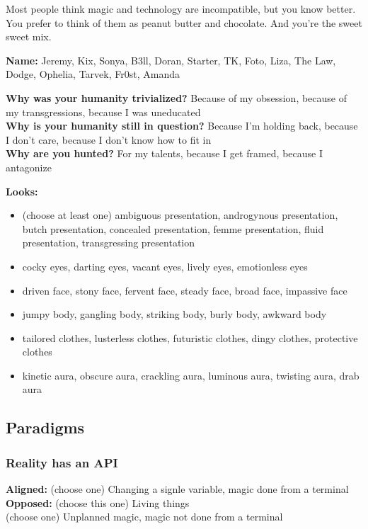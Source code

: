 \documentclass[
]{memoir}
\begin{document}
Most people think magic and technology are incompatible, but you know
better. You prefer to think of them as peanut butter and chocolate. And
you're the sweet sweet mix.

\textbf{Name:} Jeremy, Kix, Sonya, B3ll, Doran, Starter, TK, Foto, Liza,
The Law, Dodge, Ophelia, Tarvek, Fr0st, Amanda

\textbf{Why was your humanity trivialized?} Because of my obsession,
because of my transgressions, because I was uneducated\\
\textbf{Why is your humanity still in question?} Because I'm holding
back, because I don't care, because I don't know how to fit in\\
\textbf{Why are you hunted?} For my talents, because I get framed,
because I antagonize

\textbf{Looks:}

\begin{itemize}
\tightlist
\item
  (choose at least one) ambiguous presentation, androgynous
  presentation, butch presentation, concealed presentation, femme
  presentation, fluid presentation, transgressing presentation
\item
  cocky eyes, darting eyes, vacant eyes, lively eyes, emotionless eyes
\item
  driven face, stony face, fervent face, steady face, broad face,
  impassive face
\item
  jumpy body, gangling body, striking body, burly body, awkward body
\item
  tailored clothes, lusterless clothes, futuristic clothes, dingy
  clothes, protective clothes
\item
  kinetic aura, obscure aura, crackling aura, luminous aura, twisting
  aura, drab aura
\end{itemize}

\hypertarget{paradigms-6}{%
\subsection{Paradigms}\label{paradigms-6}}

\hypertarget{reality-has-an-api}{%
\subsubsection{Reality has an API}\label{reality-has-an-api}}

\textbf{Aligned:} (choose one) Changing a signle variable, magic done
from a terminal\\
\textbf{Opposed:} (choose this one) Living things\\
(choose one) Unplanned magic, magic not done from a terminal
\end{document}
